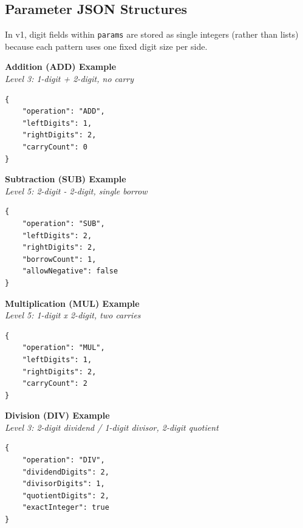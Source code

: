 \documentclass[11pt]{article}
\begin{document}
\subsection{Parameter JSON Structures}
In v1, digit fields within \texttt{params} are stored as single integers (rather than lists) because each pattern uses one fixed digit size per side.

\vspace{0.5em}\noindent\textbf{Addition (ADD) Example} \\
\textit{Level 3: 1-digit + 2-digit, no carry}
\begin{lstlisting}
{
    "operation": "ADD",
    "leftDigits": 1,
    "rightDigits": 2,
    "carryCount": 0
}
\end{lstlisting}

\vspace{0.5em}\noindent\textbf{Subtraction (SUB) Example} \\
\textit{Level 5: 2-digit - 2-digit, single borrow}
\begin{lstlisting}
{
    "operation": "SUB",
    "leftDigits": 2,
    "rightDigits": 2,
    "borrowCount": 1,
    "allowNegative": false
}
\end{lstlisting}

\vspace{0.5em}\noindent\textbf{Multiplication (MUL) Example} \\
\textit{Level 5: 1-digit x 2-digit, two carries}
\begin{lstlisting}
{
    "operation": "MUL",
    "leftDigits": 1,
    "rightDigits": 2,
    "carryCount": 2
}
\end{lstlisting}

\vspace{0.5em}\noindent\textbf{Division (DIV) Example} \\
\textit{Level 3: 2-digit dividend / 1-digit divisor, 2-digit quotient}
\begin{lstlisting}
{
    "operation": "DIV",
    "dividendDigits": 2,
    "divisorDigits": 1,
    "quotientDigits": 2,
    "exactInteger": true
}
\end{lstlisting}
\end{document}
